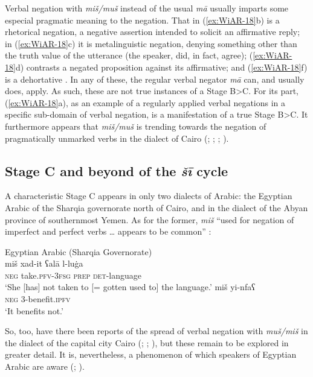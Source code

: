\documentclass[output=paper]{langsci/langscibook}
\begin{document}
Verbal negation with \textit{miš/muš} instead of the usual \textit{mā} usually imparts some especial pragmatic meaning to the negation. That in (\ref{ex:WiAR-18}b) is a rhetorical negation, a negative assertion intended to solicit an affirmative reply; in (\ref{ex:WiAR-18}c) it is metalinguistic negation, denying something other than the truth value of the utterance (the speaker, did, in fact, agree); (\ref{ex:WiAR-18}d) contrasts a negated proposition against its affirmative; and (\ref{ex:WiAR-18}f) is a dehortative \citep{wilmsen2016b}. In any of these, the regular verbal negator \textit{mā} can, and usually does, apply. As such, these are not true instances of a Stage B>C. For its part, (\ref{ex:WiAR-18}a), as an example of a regularly applied verbal negations in a specific sub-domain of verbal negation, is a manifestation of a true Stage B>C. It furthermore appears that \textit{miš/muš} is trending towards the negation of pragmatically unmarked verbs in the dialect of Cairo (\citealp[303]{brustad2000a}; \citealp{doss2008a}; \citealp{h2011a}; \citealp[519]{wilmsen2020a}).

\subsection{Stage C and beyond of the \textit{šī} cycle} \label{s:WiAR-3.5}

A characteristic Stage C appears in only two dialects of Arabic: the Egyptian Arabic of the Sharqia governorate north of Cairo, and in the dialect of the Abyan province of southernmost Yemen. As for the former, \textit{miš} “used for negation of imperfect and perfect verbs … appears to be common” \citep[v, 70--72, emphasis added]{h2011a}:

\ea Egyptian Arabic (Sharqia Governorate)\label{ex:WiAR-19}\\
  \ea
  	\gll miš xad-it ʕalā l-luġa\\
  	\textsc{neg} take.\textsc{pfv-3fsg} \textsc{prep} \textsc{det}-language \\
  	\glt ‘She [has] not taken to [= gotten used to] the language.’ \citep[59]{h2011a}
  \ex
  	\gll miš yi-nfaʕ\\
  	\textsc{neg} 3-benefit.\textsc{ipfv}\\
  	\glt ‘It benefits not.’ \citep[72]{h2011a} 
\z \z

So, too, have there been reports of the spread of verbal negation with \textit{muš/miš} in the dialect of the capital city Cairo (\citealp[301–306]{brustad2000a}; \citealp{doss2008a}; \citealp[525]{wilmsen2020a}), but these remain to be explored in greater detail. It is, nevertheless, a phenomenon of which speakers of Egyptian Arabic are aware (\citealp[301]{brustad2000a}; \citealp[65--72]{h2011a}).
\end{document}

